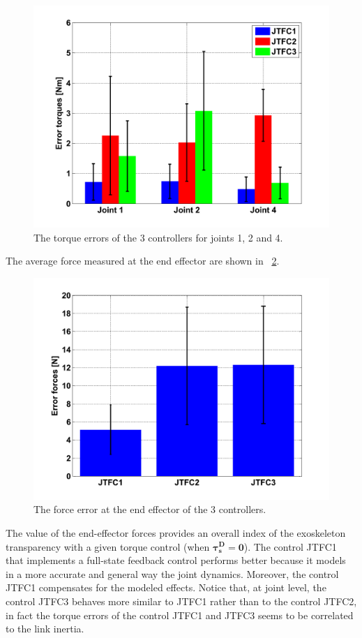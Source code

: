 \documentclass[journal]{IEEEtran}
\newcommand{\vects}[1]{{\boldsymbol {#1}}}
\begin{document}
\begin{figure}[htb]
	\centering
	\includegraphics[width=1\columnwidth]{erroriTrasparenzaGiunti}
	\caption{The torque errors of the 3 controllers for joints 1, 2 and 4.}
	\label{fig:transparencyJointErrors}
\end{figure}
%
The average force measured at the end effector are shown in \figurename \ \ref{fig:transparencyEeErrors}.
\begin{figure}[htb]
	\centering
	\includegraphics[width=1\columnwidth]{erroreForzaEETrasparenza}
	\caption{The force error at the end effector of the 3 controllers.}
	\label{fig:transparencyEeErrors}
\end{figure}
%
\par The value of the end-effector forces provides an overall index of the exoskeleton transparency with a given torque control (when $\vects{\tau_s^D=0}$). The control JTFC1 that implements a full-state feedback control performs better because it models in a more accurate and general way the joint dynamics. Moreover, the control JTFC1 compensates for the modeled effects. Notice that, at joint level, the control JTFC3 behaves more similar to JTFC1 rather than to the control JTFC2, in fact the torque errors of the control JTFC1 and JTFC3 seems to be correlated to the link inertia.
\end{document}
